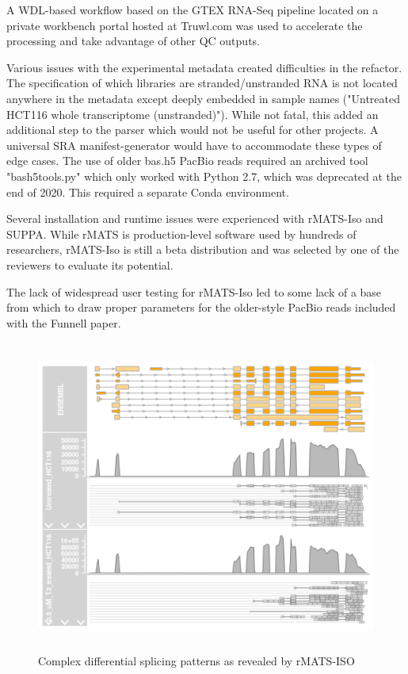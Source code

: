 \documentclass{drexelthesis}
\begin{document}
A WDL-based workflow based on the GTEX RNA-Seq pipeline located on a private workbench portal hosted at Truwl.com was used to accelerate the processing and take advantage of other QC outputs.

Various issues with the experimental metadata created difficulties in the refactor. The specification of which libraries are stranded/unstranded RNA is not located anywhere in the metadata except deeply embedded in sample names ("Untreated HCT116 whole transcriptome (unstranded)"). While not fatal, this added an additional step to the parser which would not be useful for other projects. A universal SRA manifest-generator would have to accommodate these types of edge cases. The use of older bas.h5 PacBio reads required an archived tool "bash5tools.py" which only worked with Python 2.7, which was deprecated at the end of 2020. This required a separate Conda environment.

Several installation and runtime issues were experienced with rMATS-Iso and SUPPA. While rMATS is production-level software used by hundreds of researchers, rMATS-Iso is still a beta distribution and was selected by one of the reviewers to evaluate its potential.

The lack of widespread user testing for rMATS-Iso led to some lack of a base from which to draw proper parameters for the older-style PacBio reads included with the Funnell paper.

\begin{figure}[h!]
	\centering
\includegraphics[width=12.83cm,height=10.27cm]{./images/asm.png}
\caption{Complex differential splicing patterns as revealed by rMATS-ISO}
\end{figure}
\end{document}
